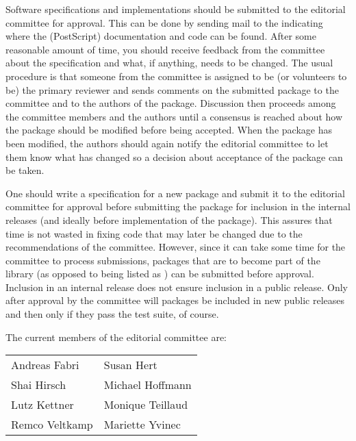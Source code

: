 Software specifications and implementations should be submitted to the 
editorial committee for approval.  This can be done by sending mail to 
the 
 indicating
where the (PostScript) documentation and code can be found.  After
some reasonable amount of time, you should receive feedback from 
the committee about the specification and what, if anything, needs to
be changed. The usual procedure is that someone from the committee is
assigned to be (or volunteers to be) the primary reviewer and sends 
comments on the submitted package to the committee and to the authors of
the package.  Discussion then proceeds among the committee members and the
authors until a consensus is reached about how the package should be
modified before being accepted.  When the package has been modified,
the authors should again notify the editorial committee to let them
know what has changed so a decision about acceptance of the package
can be taken.  


One should write a specification for a new package
and submit it to the editorial committee for 
approval before submitting the package for inclusion in the internal
releases (and ideally before implementation of the package).  This
assures that time is not wasted in fixing code that may later be changed
due to the recommendations of the committee.
However, since it can take some time for the committee to process
submissions, packages that are to become part of the library 
(as opposed to being listed as 
)
can be submitted 
 before approval.
Inclusion in an internal release does not ensure inclusion in a public
release.  Only after approval by the committee will packages be included in new
public releases and then only if they pass the test suite, of course.

The current members of the editorial committee are:
\begin{center}
\begin{tabular}{p{5cm}p{5cm}}
Andreas Fabri          & Susan Hert  \\
Shai Hirsch            & Michael Hoffmann \\
Lutz Kettner           & Monique Teillaud  \\
Remco Veltkamp         & Mariette Yvinec 
\end{tabular}
\end{center}

